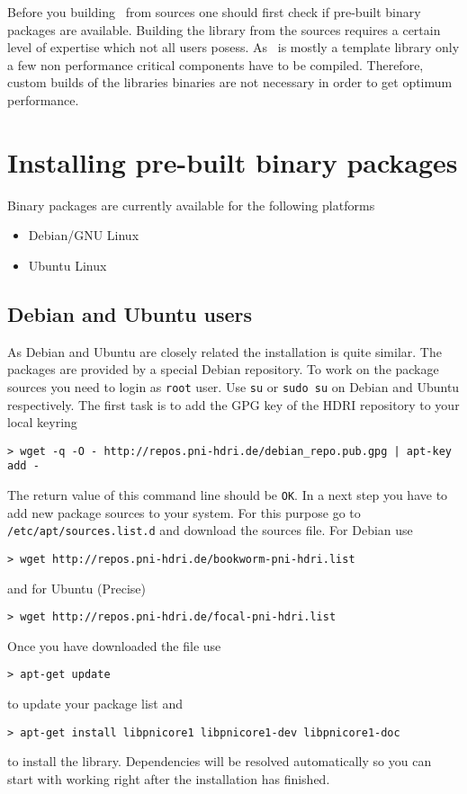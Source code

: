 
Before you building \libpnicore\ from sources one should first check if
pre-built binary packages are available. Building the library from the sources
requires a certain level of expertise which not all users posess. 
As
\libpnicore\ is mostly a template library only a few non performance critical
components have to be compiled. Therefore, custom builds of the libraries
binaries are not necessary in order to get optimum performance.

\section{Installing pre-built binary packages}

Binary packages are currently available for the following platforms 
\begin{itemize}
\item Debian/GNU Linux 
\item Ubuntu Linux 
\end{itemize}

\subsection{Debian and Ubuntu users}

As Debian and Ubuntu are closely related the installation is quite similar. 
The packages are provided by a special Debian repository. To work on the package
sources you need to login as \texttt{root} user. Use \texttt{su} or \texttt{sudo su} on
Debian and Ubuntu respectively. 
The first task is to add the GPG key of the HDRI repository to your local
keyring
\begin{verbatim}
> wget -q -O - http://repos.pni-hdri.de/debian_repo.pub.gpg | apt-key add -
\end{verbatim}
The return value of this command line should be \texttt{OK}.
In a next step you have to add new package sources to your system. For this
purpose go to \texttt{/etc/apt/sources.list.d} and download the sources file. 
For Debian use
\begin{verbatim}
> wget http://repos.pni-hdri.de/bookworm-pni-hdri.list
\end{verbatim}
and for Ubuntu (Precise) 
\begin{verbatim}
> wget http://repos.pni-hdri.de/focal-pni-hdri.list
\end{verbatim}
Once you have downloaded the file use 
\begin{verbatim}
> apt-get update
\end{verbatim}
to update your package list and 
\begin{verbatim}
> apt-get install libpnicore1 libpnicore1-dev libpnicore1-doc
\end{verbatim}
to install the library. Dependencies will be resolved automatically so you can
start with working right after the installation has finished.


